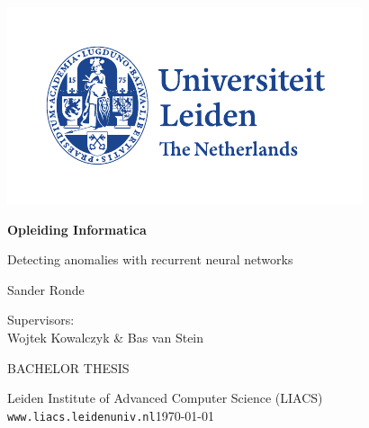 \thispagestyle{empty}

\includegraphics{resources/logoleiden}

\vspace{-2.5cm}\hfill \begin{huge}\textbf{Opleiding Informatica}\end{huge}

\vspace{5cm}
\begin{Large}
\hfill Detecting anomalies with recurrent neural networks

\vspace*{25mm}

\hfill Sander Ronde
\end{Large}

\vspace*{4.5cm}

\begin{large}

Supervisors:\\
Wojtek Kowalczyk \& Bas van Stein


\vspace*{2.8cm}
BACHELOR THESIS

\vspace*{5mm}
Leiden Institute of Advanced Computer Science (LIACS)\\
\texttt{www.liacs.leidenuniv.nl}\hfill \today
\end{large}

